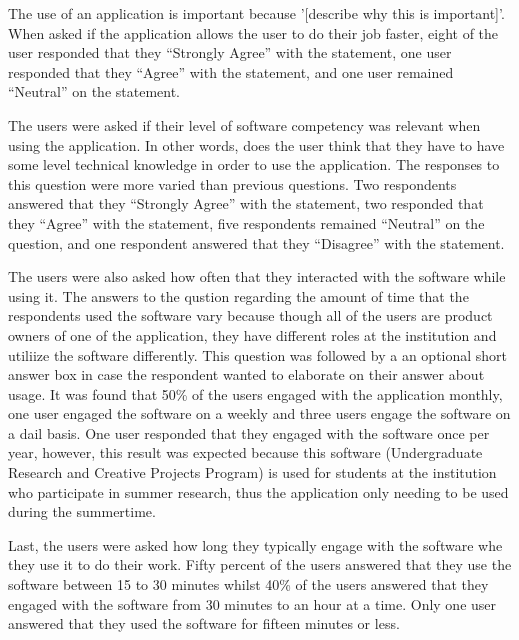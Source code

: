 The use of an application is important because '[describe why this is important]'. When asked if the application allows the user to do their job faster, eight of the user responded that they ``Strongly Agree'' with the statement, one user responded that they ``Agree'' with the statement, and one user remained ``Neutral'' on the statement.

The users were asked if their level of software competency was relevant when using the application. In other words, does the user think that they have to have some level technical knowledge in order to use the application. The responses to this question were more varied than previous questions. Two respondents answered that they ``Strongly Agree'' with the statement,  two responded that they ``Agree'' with the statement, five respondents remained ``Neutral'' on the question, and one respondent answered that they ``Disagree'' with the statement.

The users were also asked how often that they interacted with the software while using it. The answers to the qustion regarding the amount of time that the respondents used the software vary because though all of the users are product owners of one of the application, they have different roles at the institution and utiliize the software differently. This question was followed by a an optional short answer box in case the respondent wanted to elaborate on their answer about usage. It was found that 50\% of the users engaged with the application monthly, one user engaged the software on a weekly and three users engage the software on a dail basis. One user responded that they engaged with the software once per year, however, this result was expected because this software (Undergraduate Research and Creative Projects Program) is used for students at the institution who participate in summer research, thus the application only needing to be used during the summertime.

Last, the users were asked how long they typically engage with the software whe they use it to do their work. Fifty percent of the users answered that they use the software between 15 to 30 minutes whilst 40\% of the users answered that they engaged with the software from 30 minutes to an hour at a time. Only one user answered that they used the software for fifteen minutes or less.


